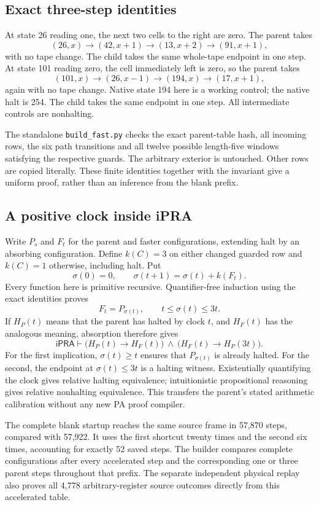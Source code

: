 \subsection{Exact three-step identities}

At state 26 reading one, the next two cells to the right are zero. The
parent takes
\[
 (26,x)\longrightarrow(42,x+1)\longrightarrow(13,x+2)
                  \longrightarrow(91,x+1),
\]
with no tape change. The child takes the same whole-tape endpoint in one
step. At state 101 reading zero, the cell immediately left is zero, so
the parent takes
\[
 (101,x)\longrightarrow(26,x-1)\longrightarrow(194,x)
                   \longrightarrow(17,x+1),
\]
again with no tape change. Native state 194 here is a working control;
the native halt is 254. The child takes the same endpoint in one step.
All intermediate controls are nonhalting.

The standalone \texttt{build\_fast.py} checks the exact parent-table hash,
all incoming rows, the six path transitions and all twelve possible
length-five windows satisfying the respective guards. The arbitrary
exterior is untouched. Other rows are copied literally. These finite
identities together with the invariant give a uniform proof, rather than
an inference from the blank prefix.

\subsection{A positive clock inside iPRA}

Write $P_s$ and $F_t$ for the parent and faster configurations, extending
halt by an absorbing configuration. Define $k(C)=3$ on either changed
guarded row and $k(C)=1$ otherwise, including halt. Put
\[
 \sigma(0)=0,\qquad
 \sigma(t+1)=\sigma(t)+k(F_t).
\]
Every function here is primitive recursive. Quantifier-free induction
using the exact identities proves
\[
 F_t=P_{\sigma(t)},\qquad t\le\sigma(t)\le3t.
\]
If $H_P(t)$ means that the parent has halted by clock $t$, and $H_F(t)$
has the analogous meaning, absorption therefore gives
\[
 \mathsf{iPRA}\vdash
 \bigl(H_P(t)\to H_F(t)\bigr)\ \wedge\
 \bigl(H_F(t)\to H_P(3t)\bigr).
\]
For the first implication, $\sigma(t)\ge t$ ensures that $P_{\sigma(t)}$
is already halted. For the second, the endpoint at $\sigma(t)\le3t$
is a halting witness. Existentially quantifying the clock gives relative
halting equivalence; intuitionistic propositional reasoning gives relative
nonhalting equivalence. This transfers the parent's stated arithmetic
calibration without any new PA proof compiler.

The complete blank startup reaches the same source frame in 57,870
steps, compared with 57,922. It uses the first shortcut twenty times and
the second six times, accounting for exactly 52 saved steps. The builder
compares complete configurations after every accelerated step and the
corresponding one or three parent steps throughout that prefix.
The separate independent physical replay also proves all 4,778
arbitrary-register source outcomes directly from this accelerated table.

